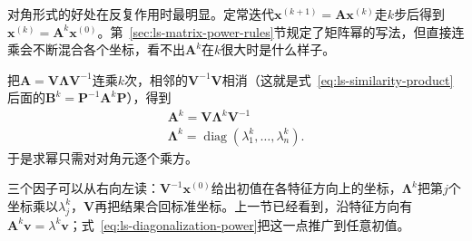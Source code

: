 对角形式的好处在反复作用时最明显。定常迭代$\bm x^{(k+1)}=\bm A\bm x^{(k)}$走$k$步后得到$\bm x^{(k)}=\bm A^k\bm x^{(0)}$。第~\ref{sec:ls-matrix-power-rules}节规定了矩阵幂的写法，但直接连乘会不断混合各个坐标，看不出$\bm A^k$在$k$很大时是什么样子。

把$\bm A=\bm V\bm\Lambda\bm V^{-1}$连乘$k$次，相邻的$\bm V^{-1}\bm V$相消（这就是式~\eqref{eq:ls-similarity-product}后面的$\bm B^k=\bm P^{-1}\bm A^k\bm P$），得到
\begin{equation}
\begin{gathered}
\bm A^k=\bm V\bm\Lambda^k\bm V^{-1}\\
\bm\Lambda^k=\operatorname{diag}(\lambda_1^k,\ldots,\lambda_n^k).
\end{gathered}
\label{eq:ls-diagonalization-power}
\end{equation}
于是求幂只需对对角元逐个乘方。

三个因子可以从右向左读：$\bm V^{-1}\bm x^{(0)}$给出初值在各特征方向上的坐标，$\bm\Lambda^k$把第$j$个坐标乘以$\lambda_j^k$，$\bm V$再把结果合回标准坐标。上一节已经看到，沿特征方向有$\bm A^k\bm v=\lambda^k\bm v$；式~\eqref{eq:ls-diagonalization-power}把这一点推广到任意初值。

